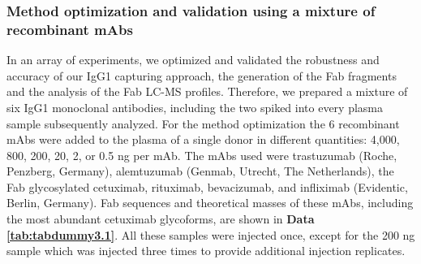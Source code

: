 \subsubsection{Method optimization and validation using a mixture of recombinant mAbs}
In an array of experiments, we optimized and validated the robustness and accuracy of our IgG1 capturing approach, the generation of the Fab fragments and the analysis of the Fab LC-MS profiles. Therefore, we prepared a mixture of six IgG1 monoclonal antibodies, including the two spiked into every plasma sample subsequently analyzed. For the method optimization the 6 recombinant mAbs were added to the plasma of a single donor in different quantities: 4,000, 800, 200, 20, 2, or 0.5 ng per mAb. The mAbs used were trastuzumab (Roche, Penzberg, Germany), alemtuzumab (Genmab, Utrecht, The Netherlands), the Fab glycosylated cetuximab, rituximab, bevacizumab, and infliximab (Evidentic, Berlin, Germany). Fab sequences and theoretical masses of these mAbs, including the most abundant cetuximab glycoforms, are shown in \textbf{Data \ref{tab:tabdummy3.1}}. All these samples were injected once, except for the 200 ng sample which was injected three times to provide additional injection replicates.

